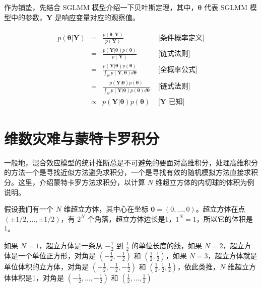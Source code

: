 \documentclass[12pt,a4paper,UTF8,twoside]{book}
\theoremstyle{definition}
\theoremstyle{definition}
\theoremstyle{definition}
\theoremstyle{remark}
\begin{document}
作为铺垫，先结合 SGLMM
模型介绍一下贝叶斯定理，其中，\(\boldsymbol{\theta}\) 代表 SGLMM
模型中的参数，\(\mathbf{Y}\) 是响应变量对应的观察值。

\begin{align}
\begin{array}{rcll}
p(\boldsymbol{\theta}|\mathbf{Y})  & =  & \displaystyle \frac{p(\boldsymbol{\theta},\mathbf{Y})}{p(\mathbf{Y})}
& \mbox{ [条件概率定义]}
\\[16pt]
& = & \displaystyle \frac{p(\mathbf{Y}|\boldsymbol{\theta}) p(\boldsymbol{\theta})}{p(\mathbf{Y})}
& \mbox{ [链式法则]}
\\[16pt]
& = & \displaystyle \frac{p(\mathbf{Y}|\boldsymbol{\theta})p(\boldsymbol{\theta})}{\int_{\Theta}p(\mathbf{Y},\boldsymbol{\theta})d\boldsymbol{\theta}}
& \mbox{ [全概率公式]}
\\[16pt]
& = & \displaystyle \frac{p(\mathbf{Y}|\boldsymbol{\theta})p(\boldsymbol{\theta})}{\int_{\Theta}p(\mathbf{Y}|\boldsymbol{\theta})p(\boldsymbol{\theta})d\boldsymbol{\theta}}
& \mbox{ [链式法则]}
\\[16pt]
& \propto & \displaystyle p(\mathbf{Y}|\boldsymbol{\theta})p(\boldsymbol{\theta})
& \mbox{ [$\mathbf{Y}$ 已知]}
\end{array} \label{eq:bayes-theorem}
\end{align}

\hypertarget{Curse-of-Dimensionality}{%
\section{维数灾难与蒙特卡罗积分}\label{Curse-of-Dimensionality}}

一般地，混合效应模型的统计推断总是不可避免的要面对高维积分，处理高维积分的方法一个是寻找近似方法避免求积分，一个是寻找有效的随机模拟方法直接求积分。这里，介绍蒙特卡罗方法求积分，以计算
\(N\) 维超立方体的内切球的体积为例说明。

假设我们有一个 \(N\) 维超立方体，其中心在坐标
\(\mathbf{0} = (0,\ldots,0)\)。超立方体在点
\((\pm 1/2,\ldots,\pm 1/2)\)，有 \(2^{N}\)
个角落，超立方体边长是1，\(1^{N}=1\)，所以它的体积是1。

如果 \(N=1\)，超立方体是一条从 \(-\frac{1}{2}\) 到 \(\frac{1}{2}\)
的单位长度的线，如果 \(N=2\)，超立方体是一个单位正方形，对角是
\(\left( -\frac{1}{2}, -\frac{1}{2} \right)\) 和
\(\left( \frac{1}{2}, \frac{1}{2} \right)\)，如果
\(N=3\)，超立方体就是单位体积的立方体，对角是
\(\left( -\frac{1}{2}, -\frac{1}{2}, -\frac{1}{2} \right)\) 和
\(\left( \frac{1}{2}, \frac{1}{2}, \frac{1}{2} \right)\)，依此类推，\(N\)
维超立方体体积是1，对角是
\(\left( -\frac{1}{2}, \ldots, -\frac{1}{2} \right)\) 和
\(\left( \frac{1}{2}, \ldots, \frac{1}{2} \right)\)
\end{document}
